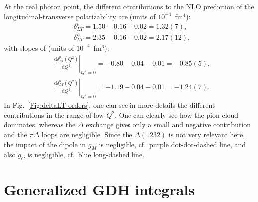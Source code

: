 \documentclass[twocolumn,prc,showpacs,nofootinbib,preprintnumbers,amsmath,amssymb,superscriptaddress]{revtex4-1}
\def\dd{\mathrm{d}}
\begin{document}
At the real photon point, the different contributions to the NLO prediction of the longitudinal-transverse polarizability are (units of $10^{-4}$~fm$^4$):
\begin{align}\label{Eq:deltaLTRealPoint}
&\delta^p_{LT} = 1.50 -0.16 -0.02 = 1.32(7), \\
&\delta^n_{LT} = 2.35 -0.16 -0.02 =2.17(12), 
\end{align}
with slopes of (units of $10^{-4}$~fm$^6$):
\begin{align}
&\left.\frac{\dd\delta_{LT}^p (Q^2)}{\dd Q^2}\right|_{Q^2=0}=  -0.80 - 0.04 - 0.01 = -0.85(5),\\
&\left.\frac{\dd\delta_{LT}^n (Q^2)}{\dd Q^2}\right|_{Q^2=0}=  -1.19 - 0.04 -0.01 = -1.24(7).
\end{align}
In Fig.~\ref{Fig:deltaLT-orders}, one can see in more details the different contributions in the range of low $Q^2$.
One can clearly see how the pion cloud dominates, whereas the $\Delta$ exchange gives only a small and negative contribution and the $\pi \Delta$ loops are negligible. Since the $\Delta(1232)$ is not very relevant here, the impact of the dipole in $g_M$ is negligible, cf.\ purple dot-dot-dashed line, and also $g_C$ is negligible, cf.\ blue long-dashed line.





\section{Generalized GDH integrals}
\label{Sec:GeneralizedGDH}
\end{document}
